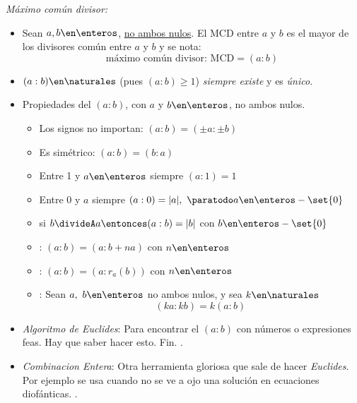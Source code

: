 \def\mcd{(a:b)}
\def\D{\mathcal D}
\def\cz{s\cdot a + t \cdot b}

\textit{Máximo común divisor: }

\begin{itemize}[label=\tiny{}]
  \item Sean $a,b \en \enteros$, \underline{no ambos nulos}. El MCD entre $a$ y $b$ es el mayor de los divisores
        común entre $a$ y $b$ y se nota:
        $$
          \boxed{
            \text{máximo común divisor: MCD}= \mcd
          }
        $$

  \item $\mcd \en \naturales$ (pues $\mcd \geq 1$) \textit{siempre existe} y es \textit{único}.

  \item Propiedades del $(a:b)$, con $a$ y $b \en \enteros$, no ambos nulos.
        \begin{itemize}[label={\tiny{}}]
          \item Los signos no importan: $\mcd = (\pm a : \pm b)$
          \item Es simétrico: $\mcd = (b:a)$
          \item Entre 1 y $a \en \enteros$ siempre $(a:1) = 1$
          \item Entre 0 y $a$ siempre $(a:0) = |a|,\ \paratodo a \en \enteros -\set{0}$
          \item si $b \divideA a \entonces \mcd = |b|$ con $b \en \enteros - \set{0}$
          \item {}: $\mcd = (a: b+na)$ con $n \en \enteros$
          \item {}: $\mcd = (a: r_a(b))$ con $n \en \enteros$
          \item {}: Sean $a,\ b \en \enteros$ no ambos nulos, y sea $k \en \naturales$
                $$
                  (ka:kb) = k(a:b)
                $$
        \end{itemize}

  \item \textit{Algoritmo de Euclides}:
        Para encontrar el $(a:b)$ con números o expresiones feas. Hay que saber hacer esto. Fin.
        .

  \item \textit{Combinacion Entera}: Otra herramienta gloriosa que sale de hacer \textit{Euclides}. Por ejemplo
        se usa cuando no se ve a ojo una solución en ecuaciones diofánticas.
        .


\end{itemize}
